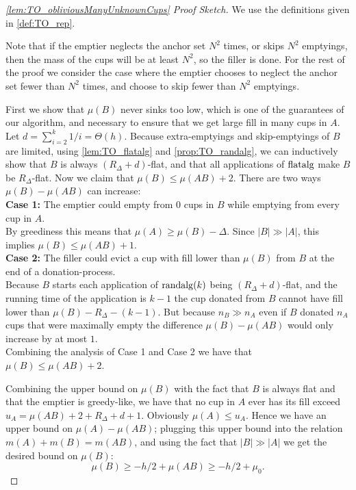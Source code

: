 \begin{proof}[\cref{lem:TO_obliviousManyUnknownCups} Proof Sketch] 
  We use the definitions given in \cref{def:TO_rep}.

  Note that if the emptier neglects the anchor set $N^2$ times,
  or skips $N^2$ emptyings, then the mass of the cups will be at
  least $N^2$, so the filler is done. For the rest of the proof
  we consider the case where the emptier chooses to neglect
  the anchor set fewer than $N^2$ times, and choose to skip fewer
  than $N^2$ emptyings.

First we show that $\mu(B)$ never sinks too low, which is one of
the guarantees of our algorithm, and necessary to ensure that we
get large fill in many cups in $A$. 
Let $d = \sum_{i=2}^k 1/i =
\Theta(h)$. Because extra-emptyings and skip-emptyings of $B$ are
limited, using \cref{lem:TO_flatalg} and
\cref{prop:TO_randalg}, we can inductively show that $B$ is
always $(R_\Delta + d)$-flat, and that all applications of
$\operatorname{\text{\textup{flatalg}}}$ make $B$ be $R_\Delta$-flat. Now we claim that
$\mu(B) \le \mu(AB) + 2.$ There are two ways $\mu(B) - \mu(AB)$
can increase:\\
\textbf{Case 1:}
The emptier could empty from $0$ cups in $B$ while emptying
from every cup in $A$. \\
By greediness this means that $\mu(A) \ge \mu(B) - \Delta$. Since
$|B| \gg |A|$, this implies $\mu(B) \le \mu(AB) + 1$.\\
\textbf{Case 2:}
The filler could evict a cup with fill lower than $\mu(B)$ from
$B$ at the end of a donation-process. \\
Because $B$ starts each application of $\operatorname{\text{\textup{randalg}}}(k)$ being
$(R_\Delta + d)$-flat, and the running time of the application is
$k-1$ the cup donated from $B$ cannot have fill lower than $\mu(B) -
R_\Delta - (k-1)$. But because $n_B \gg n_A$ even if $B$ donated
$n_A$ cups that were maximally empty the difference
$\mu(B)-\mu(AB)$ would only increase by at most $1$.\\
Combining the analysis of Case 1 and Case 2 we have that $\mu(B)
\le \mu(AB) + 2$.

Combining the upper bound on $\mu(B)$ with the fact that $B$ is
always flat and that the emptier is greedy-like, we have that no
cup in $A$ ever has its fill exceed $u_A = \mu(AB) + 2 + R_\Delta + d + 1.$
Obviously $\mu(A)\le u_A$. Hence we have an upper bound on
$\mu(A)-\mu(AB)$; plugging this upper bound into the relation 
$m(A) + m(B) = m(AB)$, and using the fact that $|B| \gg |A|$ we
get the desired bound on $\mu(B)$:
$$\mu(B) \ge -h/2 + \mu(AB) \ge -h/2 + \mu_0.$$


\end{proof}
